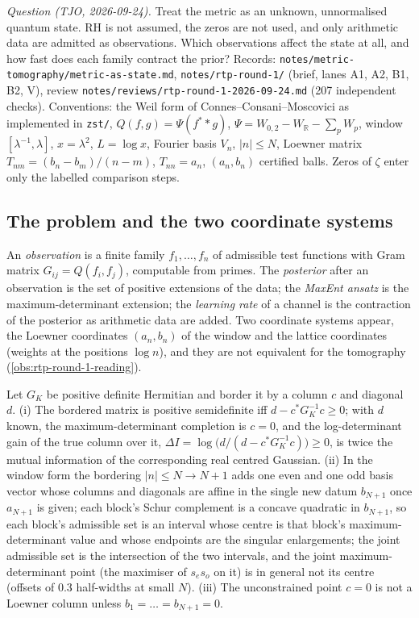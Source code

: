 \emph{Question (TJO, 2026-09-24).} Treat the metric as an unknown, unnormalised quantum state. RH is not
assumed, the zeros are not used, and only arithmetic data are admitted as observations. Which observations
affect the state at all, and how fast does each family contract the prior? Records:
\texttt{notes/metric-tomography/metric-as-state.md}, \texttt{notes/rtp-round-1/} (brief, lanes A1, A2, B1,
B2, V), review \texttt{notes/reviews/rtp-round-1-2026-09-24.md} (207 independent checks). Conventions: the
Weil form of Connes--Consani--Moscovici as implemented in \texttt{zst/}, $Q(f,g) = \Psi(f^**g)$,
$\Psi = W_{0,2}-W_{\mathbb R}-\sum_pW_p$, window $[\lambda^{-1},\lambda]$, $x = \lambda^2$, $L = \log x$, Fourier
basis $V_n$, $|n|\le N$, Loewner matrix $T_{nm} = (b_n-b_m)/(n-m)$, $T_{nn} = a_n$, $(a_n,b_n)$ certified balls.
Zeros of $\zeta$ enter only the labelled comparison steps.

\subsection{The problem and the two coordinate systems}
An \emph{observation} is a finite family $f_1,\dots,f_n$ of admissible test functions with Gram matrix $G_{ij} = Q(f_i,f_j)$, computable from primes.
The \emph{posterior} after an observation is the set of positive extensions of the data; the \emph{MaxEnt
ansatz} is the maximum-determinant extension; the \emph{learning rate} of a channel is the contraction of the
posterior as arithmetic data are added. Two coordinate systems appear, the Loewner coordinates $(a_n,b_n)$ of
the window and the lattice coordinates (weights at the positions $\log n$), and they are not equivalent for the
tomography (\cref{obs:rtp-round-1-reading}).

\begin{lemma}
\label{lem:bordering-interval}
Let $G_K$ be positive definite Hermitian and border it by a column $c$ and diagonal $d$. (i) The bordered
matrix is positive semidefinite iff $d-c^*G_K^{-1}c\ge0$; with $d$ known, the maximum-determinant completion is
$c = 0$, and the log-determinant gain of the true column over it, $\varDelta I = \log\big(d/(d-c^*G_K^{-1}c)\big)\ge0$,
is twice the mutual information of the corresponding real centred Gaussian. (ii) In the window form the
bordering $|n|\le N\to N+1$ adds one even and one odd basis vector whose columns and diagonals are affine in the
single new datum $b_{N+1}$ once $a_{N+1}$ is given; each block's Schur complement is a concave quadratic in
$b_{N+1}$, so each block's admissible set is an interval whose centre is that block's maximum-determinant
value and whose endpoints are the singular enlargements; the joint admissible set is the intersection of the
two intervals, and the joint maximum-determinant point (the maximiser of $s_es_o$ on it) is in general not its
centre (offsets of $0.3$ half-widths at small $N$). (iii) The unconstrained point $c = 0$ is not a Loewner
column unless $b_1=\dots=b_{N+1} = 0$.
\end{lemma}

